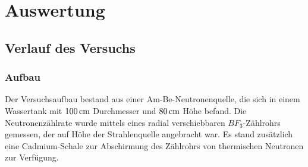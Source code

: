 \documentclass[a4paper,titlepage]{scrartcl}
\numberwithin{equation}{section}
\begin{document}
\section{Auswertung}
\subsection{Verlauf des Versuchs}
\subsubsection{Aufbau}
Der Versuchsaufbau bestand aus einer Am-Be-Neutronenquelle, die sich in einem Wassertank mit $\unit[100]{cm}$ Durchmesser und $\unit[80]{cm}$ Höhe befand. Die Neutronenzählrate wurde mittels eines radial verschiebbaren $BF_3$-Zählrohrs gemessen, der auf Höhe der Strahlenquelle angebracht war. Es stand zusätzlich eine Cadmium-Schale zur Abschirmung des Zählrohrs von thermischen Neutronen zur Verfügung.
\end{document}
